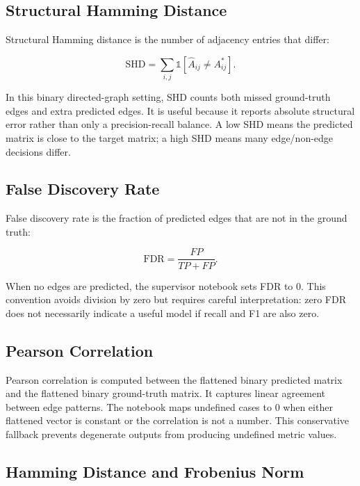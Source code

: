 \subsection{Structural Hamming Distance}

Structural Hamming distance is the number of adjacency entries that differ:

\begin{equation}
  \mathrm{SHD} = \sum_{i,j} \mathbb{1}[\hat{A}_{ij} \neq A^\ast_{ij}].
\end{equation}

In this binary directed-graph setting, SHD counts both missed ground-truth
edges and extra predicted edges. It is useful because it reports absolute
structural error rather than only a precision-recall balance. A low SHD means
the predicted matrix is close to the target matrix; a high SHD means many
edge/non-edge decisions differ.

\subsection{False Discovery Rate}

False discovery rate is the fraction of predicted edges that are not in the
ground truth:

\begin{equation}
  \mathrm{FDR} = \frac{FP}{TP + FP}.
\end{equation}

When no edges are predicted, the supervisor notebook sets FDR to 0. This
convention avoids division by zero but requires careful interpretation:
zero FDR does not necessarily indicate a useful model if recall and F1 are
also zero.

\subsection{Pearson Correlation}

Pearson correlation is computed between the flattened binary predicted matrix
and the flattened binary ground-truth matrix. It captures linear agreement
between edge patterns. The notebook maps undefined cases to 0 when either
flattened vector is constant or the correlation is not a number. This
conservative fallback prevents degenerate outputs from producing undefined
metric values.

\subsection{Hamming Distance and Frobenius Norm}

